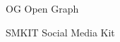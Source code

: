 \begin{abbreviations}
    \item[OG] Open Graph
    \item[SMKIT] Social Media Kit
\end{abbreviations}